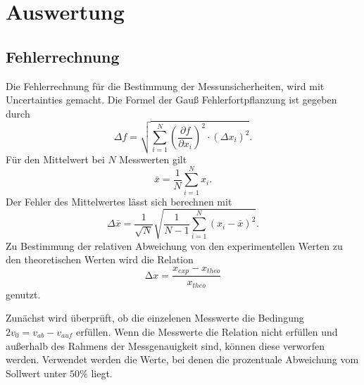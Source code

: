 \section{Auswertung}
\label{sec:auswertung}


\subsection{Fehlerrechnung}
\label{sec:Fehlerrechnung}
Die Fehlerrechnung für die Bestimmung der Messunsicherheiten, wird mit Uncertainties \cite{uncertainties} gemacht.
Die Formel der Gauß Fehlerfortpflanzung ist gegeben durch
\begin{equation}
    \Delta f=\sqrt{\sum_{i=1}^N\left(\frac{\partial f}{\partial x_i}\right)^2 \cdot\left(\Delta x_i\right)^2}.
    \label{eqn:gauss}
\end{equation}
Für den Mittelwert bei $N$ Messwerten gilt 
\begin{equation}
    \bar{x} = \frac{1}{N}\sum\limits_{i = 1}^N x_i .
    \label{eqn:mittelwert}
\end{equation}
Der Fehler des Mittelwertes lässt sich berechnen mit
\begin{equation}
    \Delta \bar{x}=\frac{1}{\sqrt{N}} \sqrt{\frac{1}{N-1} \sum_{i=1}^N\left(x_i-\bar{x}\right)^2}.
    \label{eqn:mittelwertfehler}
\end{equation}
Zu Bestimmung der relativen Abweichung von den experimentellen Werten zu den theoretischen Werten wird die
Relation 
\begin{equation}
    \increment x = \frac{x_{exp}-x_{theo}}{x_{theo}}
\end{equation} 
genutzt.

Zunächst wird überprüft, ob die einzelenen Messwerte die Bedingung $2v_0 = v_{ab}-v_{auf}$ erfüllen.
Wenn die Messwerte die Relation nicht erfüllen und außerhalb des Rahmens der Messgenauigkeit sind, können 
diese verworfen werden. Verwendet werden die Werte, bei denen die prozentuale Abweichung vom Sollwert unter
$50 \%$ liegt.
